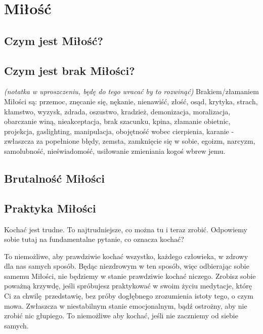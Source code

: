 \section{Miłość}

\subsection{Czym jest Miłość?}
\label{milosc/milosc}

\subsection{Czym jest brak Miłości?}
\label{milosc/brak-milosci}

\emph{(notatka w uproszczeniu, będę do tego wracać by to rozwinąć)}
Brakiem/złamaniem Miłości są:
przemoc, znęcanie się, nękanie, nienawiść, złość, osąd, krytyka,
strach, kłamstwo, wyzysk, zdrada, oszustwo, kradzież,
demonizacja, moralizacja, obarczanie winą, nieakceptacja, 
brak szacunku, kpina, złamanie obietnic, projekcja, gaslighting, manipulacja,
obojętność wobec cierpienia, karanie - zwłaszcza za popełnione błędy,
zemsta, zamknięcie się w sobie, egoizm, narcyzm, samolubność,
nieświadomość, usiłowanie zmieniania kogoś wbrew jemu.

\subsection{Brutalność Miłości}
\label{milosc/brutalnosc-milosci}

\subsection{Praktyka Miłości}
\label{milosc/praktyka-milosci}

Kochać jest trudne. To najtrudniejsze, co można tu i teraz zrobić.
Odpowiemy sobie tutaj na fundamentalne pytanie, co oznacza kochać?

To niemożliwe, aby prawdziwie kochać wszystko, każdego człowieka, w zdrowy dla nas samych sposób.
Będąc niezdrowym w ten sposób, więc odbierając sobie samemu Miłości, nie będziemy w stanie prawdziwie kochać niczego.
Zrobisz sobie poważną krzywdę, jeśli spróbujesz praktykować w swoim życiu medytacje, którę Ci za chwilę przedstawię,
bez próby dogłębnego zrozumienia istoty tego, o czym mowa.
Zwłaszcza w niestabilnym stanie emocjonalnym, bądź ostrożny, aby nie zrobić nic głupiego.
To niemożliwe aby kochać, jeśli nie zaczniemy od siebie samych. 

